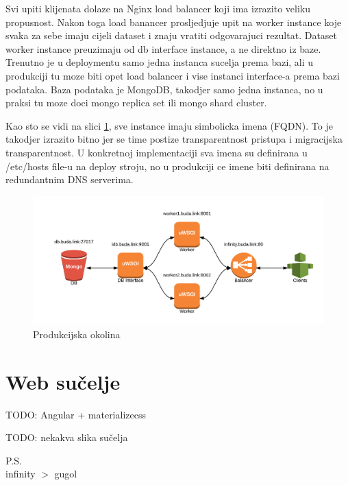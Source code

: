 \documentclass[a4paper,11pt]{article}
\begin{document}
Svi upiti klijenata dolaze na Nginx load balancer koji ima izrazito veliku propusnost. Nakon toga load banancer prosljedjuje upit na worker instance koje svaka za sebe imaju cijeli dataset i znaju vratiti odgovarajuci rezultat. Dataset worker instance preuzimaju od db interface instance, a ne direktno iz baze. Trenutno je u deploymentu samo jedna instanca sucelja prema bazi, ali u produkciji tu moze biti opet load balancer i vise instanci interface-a prema bazi podataka. Baza podataka je MongoDB, takodjer samo jedna instanca, no u praksi tu moze doci mongo replica set ili mongo shard cluster.

Kao sto se vidi na slici \ref{production_environment}, sve instance imaju simbolicka imena (FQDN). To je takodjer izrazito bitno jer se time postize transparentnost pristupa i migracijska transparentnost. U konkretnoj implementaciji sva imena su definirana u /etc/hosts file-u na deploy stroju, no u produkciji ce imene biti definirana na redundantnim DNS serverima.

\begin{figure}[!htbp]
\begin{center}
\includegraphics[width=\textwidth]{infinity.png}
\end{center}
\caption{Produkcijska okolina}\label{production_environment}
\end{figure}

\section{Web sučelje}

TODO: Angular + materializecss

TODO: nekakva slika sučelja

\vspace{1cm}
P.S.
\\[0.3cm]
infinity $>$ gugol



\end{document}

